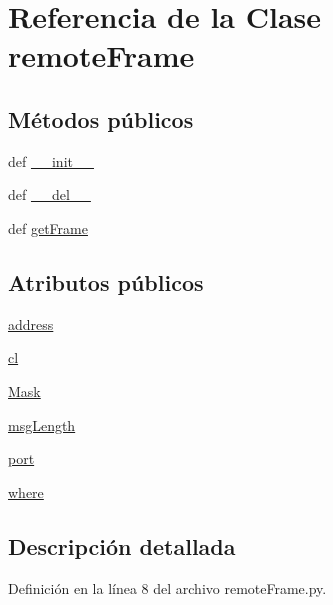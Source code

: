 \hypertarget{classremoteFrame_1_1remoteFrame}{\section{Referencia de la Clase remote\+Frame}
\label{classremoteFrame_1_1remoteFrame}
}
\subsection*{Métodos públicos}
\begin{DoxyCompactItemize}
\item 
def \hyperlink{classremoteFrame_1_1remoteFrame_ac775ee34451fdfa742b318538164070e}{\+\_\+\+\_\+init\+\_\+\+\_\+}
\item 
def \hyperlink{classremoteFrame_1_1remoteFrame_afa251912978c7d5ccf7e5a027a4d12ee}{\+\_\+\+\_\+del\+\_\+\+\_\+}
\item 
def \hyperlink{classremoteFrame_1_1remoteFrame_af9458ce42581fff9b03a7e20c1e333d0}{get\+Frame}
\end{DoxyCompactItemize}
\subsection*{Atributos públicos}
\begin{DoxyCompactItemize}
\item 
\hyperlink{classremoteFrame_1_1remoteFrame_ade5a18d52133ef21f211020ceb464c07}{address}
\item 
\hyperlink{classremoteFrame_1_1remoteFrame_a60d28e417cda8ed5b817c14e537c5629}{cl}
\item 
\hyperlink{classremoteFrame_1_1remoteFrame_a291536e8bf5e2f42dec8ed3f82b13487}{Mask}
\item 
\hyperlink{classremoteFrame_1_1remoteFrame_a643996cc8d402d1005166f956adfe0da}{msg\+Length}
\item 
\hyperlink{classremoteFrame_1_1remoteFrame_af8fb0f45ee0195c7422a49e6a8d72369}{port}
\item 
\hyperlink{classremoteFrame_1_1remoteFrame_aec4a6f499c74a3d34d4dfe9930c9e115}{where}
\end{DoxyCompactItemize}


\subsection{Descripción detallada}


Definición en la línea 8 del archivo remote\+Frame.\+py.



